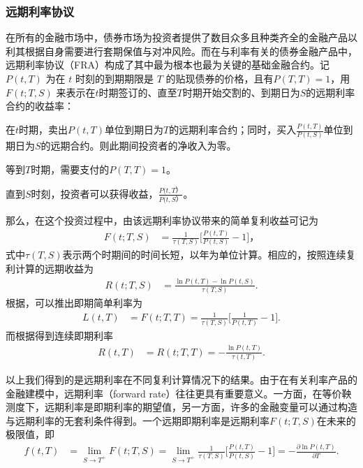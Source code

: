 \subsubsection{远期利率协议}
在所有的金融市场中，债券市场为投资者提供了数目众多且种类齐全的金融产品以利其根据自身需要进行套期保值与对冲风险。而在与利率有关的债券金融产品中，远期利率协议（FRA）构成了其中最为根本也最为关键的基础金融合约。记$P(t,T)$ 为在 $t$ 时刻的到期期限是 $T$ 的贴现债券的价格，且有$P(T,T)=1$，用 $F(t; T, S)$ 来表示在$t$时期签订的、直至$T$时期开始交割的、到期日为$S$的远期利率合约的收益率：
\begin{compactitem}
 \item 在$t$时期，卖出$P(t,T)$单位到期日为$T$的远期利率合约；同时，买入$\frac{P(t,T)}{P(t,S)}$单位到期日为$S$的远期合约。则此期间投资者的净收入为零。
 \item 等到$T$时期，需要支付的$P(T,T)=1$。
 \item 直到$S$时刻，投资者可以获得收益，$\frac{P(t,T）}{P(t,S）}$。
\end{compactitem}
那么，在这个投资过程中，由该远期利率协议带来的简单复利收益可记为
\begin{align}
F(t; T, S) &= \frac{1}{\tau(T,S)}\Big[\frac{P(t,T)}{P(t,S)} - 1 \Big]， \label{forward-spot}
\end{align}
式中$\tau(T,S)$表示两个时期间的时间长短，以年为单位计算。相应的，按照连续复利计算的远期收益为
\begin{align}
R(t; T, S) &= \frac{\ln P(t,T) - \ln P(t,S)}{\tau(T,S)}. \label{forward-comp}
\end{align}
根据，可以推出即期简单利率为
\begin{align}
L(t, T) &= F(t; T, T) = \frac{1}{\tau(T,S)}\Big[\frac{1}{P(t,T)} - 1 \Big].
\end{align}
而根据得到连续即期利率
\begin{align}
R(t, T) &= R(t; T, T) = -\frac{\ln P(t,T)}{\tau(t,T)}.
\end{align}

以上我们得到的是远期利率在不同复利计算情况下的结果。由于在有关利率产品的金融建模中，远期利率（forward rate）往往更具有重要意义。一方面，在等价鞅测度下，远期利率是即期利率的期望值，另一方面，许多的金融变量可以通过构造与远期利率的无套利条件得到。一个远期即期利率是远期利率$F(t; T, S)$在未来的极限值，即
\begin{align}
f(t,T) &= \lim_{S\rightarrow T^+} F(t; T, S) = \lim_{S\rightarrow T^+} \frac{1}{\tau(T,S)}\Big[\frac{P(t,T)}{P(t,S)} - 1 \Big] 
= - \frac{\partial \ln P(t,T)}{\partial T}. \label{forward}
\end{align}

